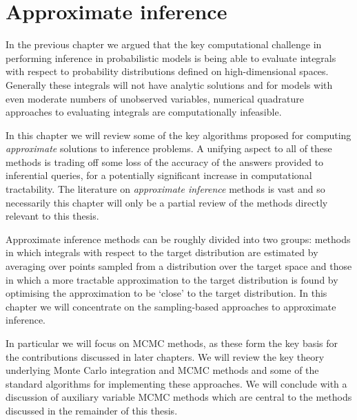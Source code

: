 \chapter{Approximate inference}\label{ch:approximate-inference}

\enlargethispage{\baselineskip}
In the previous chapter we argued that the key computational challenge in performing inference in probabilistic models is being able to evaluate integrals with respect to probability distributions defined on high-dimensional spaces. Generally these integrals will not have analytic solutions and for models with even moderate numbers of unobserved variables, numerical quadrature approaches to evaluating integrals are computationally infeasible. %

In this chapter we will review some of the key algorithms proposed for computing \emph{approximate} solutions to inference problems. A unifying aspect to all of these methods is trading off some loss of the accuracy of the answers provided to inferential queries, for a potentially significant increase in computational tractability. The literature on \emph{approximate inference} methods is vast and so necessarily this chapter will only be a partial review of the methods directly relevant to this thesis.

Approximate inference methods can be roughly divided into two groups: methods in which integrals with respect to the target distribution are estimated by averaging over points sampled from a distribution over the target space and those in which a more tractable approximation to the target distribution is found by optimising the approximation to be `close' to the target distribution. In this chapter we will concentrate on the sampling-based approaches to approximate inference. 

In particular we will focus on \ac{MCMC} methods, as these form the key basis for the contributions discussed in later chapters. We will review the key theory underlying Monte Carlo integration and \ac{MCMC} methods and some of the standard algorithms for implementing these approaches. We will conclude with a discussion of auxiliary variable \ac{MCMC} methods which are central to the methods discussed in the remainder of this thesis.   

